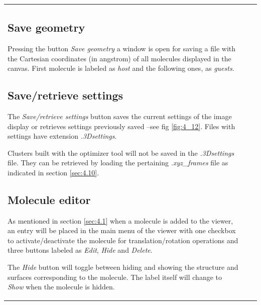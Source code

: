 \documentclass[10pt]{article}
\begin{document}
\begin{tabular}{lcr}
\hspace*{-3mm}
\begin{minipage}{.5\linewidth}
\subsection{Save geometry \label{sec:4.11}\index{3D graphics!geometry saving}}

Pressing the button {\it Save geometry}\index{save geometry}
a window is open for saving a file with the Cartesian
coordinates (in angstrom) of all molecules displayed in the canvas.
First molecule is labeled as {\it host} and the following ones,
as {\it guests}.

\subsection{Save/retrieve settings \label{sec:4.12}\index{3D graphics!save/retrieve settings}}

The {\it Save/retrieve settings}\index{save settings}\index{retrieve settings} button saves the current settings of the image display 
or retrieves settings previously saved --see fig \ref{fig:4_12}. Files with settings have extension {\it .3Dsettings}.

Clusters built with the optimizer tool will not be saved in the  
{\it *.3Dsettings} file. 
They can be retrieved\index{3D graphics!clusters retrieve}
by loading the pertaining {\it *.xyz\_frames} file as indicated in section
\ref{sec:4.10}.

\subsection{Molecule editor \label{sec:4.13}\index{3D graphics!molecule editor}}

As mentioned in section \ref{sec:4.1} when a molecule is added to the viewer,
an entry will be placed in the main menu of the viewer with one checkbox to
activate/deactivate the molecule for translation/rotation operations and three buttons
labeled as {\it Edit}, {\it Hide} and {\it Delete}.

The {\it Hide} button will toggle between hiding and showing the structure and 
surfaces corresponding to the molecule. The label itself will change to {\it Show} when the 
molecule is hidden. 

\end{minipage}
&
\begin{minipage}{.5\linewidth}


\end{minipage}
\end{tabular}
\end{document}
